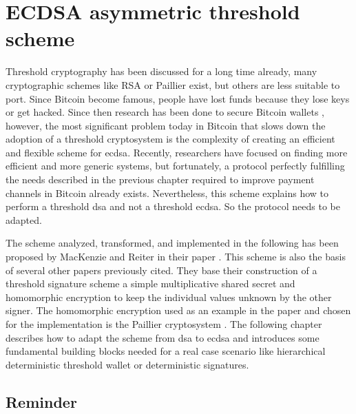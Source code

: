 \chapter{ECDSA asymmetric threshold scheme}
\label{chap:threshold}

Threshold cryptography has been discussed for a long time already, many
cryptographic schemes like RSA or Paillier \cite{10.1007/BFb0052253,
10.1007/978-3-642-27954-6_20} exist, but others are less suitable to port.
Since Bitcoin become famous, people have lost funds because they
lose keys or get hacked. Since then research has been done to secure Bitcoin
wallets \cite{Goldfeder2015SecuringBW, DBLP:conf/acns/GennaroGN16}, however, the
most significant problem today in Bitcoin that slows down the adoption of a
threshold cryptosystem is the complexity of creating an efficient and flexible
scheme for \gls{ecdsa}. Recently, researchers have focused on finding more efficient
and more generic systems, but fortunately, a protocol perfectly fulfilling the
needs described in the previous chapter required to improve payment channels in
Bitcoin already exists. Nevertheless, this scheme explains how to perform a threshold
\gls{dsa} and not a threshold \gls{ecdsa}. So the protocol needs to be
adapted.

The scheme analyzed, transformed, and implemented in the following has been
proposed by MacKenzie and Reiter in their paper  \cite{crypto-2001-1592}. This scheme is also the basis of several
other papers previously cited. They base their construction of a threshold signature
scheme a simple multiplicative shared secret and
homomorphic encryption to keep the individual values unknown by the other
signer. The homomorphic encryption used as an example in the paper and chosen for
the implementation is the Paillier cryptosystem
\cite{Paillier:1999:PCB:1756123.1756146}. The following chapter describes how to
adapt the scheme from \gls{dsa} to \gls{ecdsa} and introduces some fundamental
building blocks needed for a real case scenario like hierarchical deterministic
threshold wallet or deterministic signatures.

\minitoc

\newpage

\section{Reminder}

